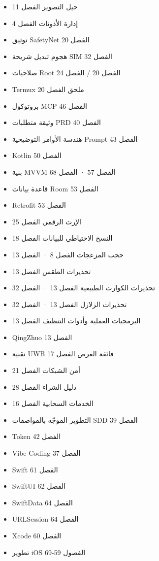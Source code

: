 
\begin{itemize}
  \item حيل التصوير الفصل 11
  \item إدارة الأذونات الفصل 4
  \item توثيق SafetyNet الفصل 20
  \item هجوم تبديل شريحة SIM الفصل 32
  \item صلاحيات Root الفصل 20 / الفصل 24
  \item Termux ملحق الفصل 20
  \item بروتوكول MCP الفصل 46
  \item وثيقة متطلبات PRD الفصل 40
  \item هندسة الأوامر التوضيحية Prompt الفصل 43
  \item Kotlin الفصل 50
  \item بنية MVVM الفصل 57 · الفصل 68
  \item قاعدة بيانات Room الفصل 53
  \item Retrofit الفصل 53
\end{itemize}


\begin{itemize}
  \item الإرث الرقمي الفصل 25
  \item النسخ الاحتياطي للبيانات الفصل 18
  \item حجب المزعجات الفصل 8 · الفصل 13
  \item تحذيرات الطقس الفصل 13
  \item تحذيرات الكوارث الطبيعية الفصل 13 · الفصل 32
  \item تحذيرات الزلازل الفصل 13 · الفصل 32
  \item البرمجيات العملية وأدوات التنظيف الفصل 13
  \item QingZhuo الفصل 13
  \item تقنية UWB فائقة العرض الفصل 17
  \item أمن الشبكات الفصل 21
  \item دليل الشراء الفصل 28
  \item الخدمات السحابية الفصل 16
  \item التطوير الموجّه بالمواصفات SDD الفصل 39
  \item Token الفصل 42
  \item Vibe Coding الفصل 37
  \item Swift الفصل 61
  \item SwiftUI الفصل 62
  \item SwiftData الفصل 64
  \item URLSession الفصل 64
  \item Xcode الفصل 60
  \item تطوير iOS الفصول 59-69
\end{itemize}


